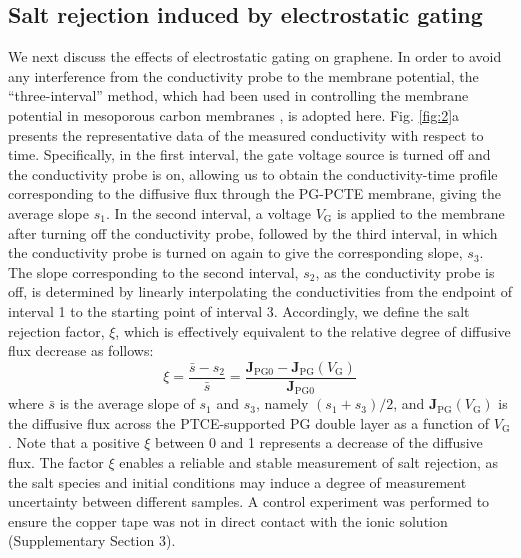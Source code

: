\documentclass[journal=langd5,email=true, hyperref=true, keywords=false]{achemso}
\newcommand{\Fig}{Fig.}
\begin{document}
\subsection{Salt rejection induced by electrostatic gating}
\label{sec:res-2}

We next discuss the effects of electrostatic gating on graphene. In
order to avoid any interference from the conductivity probe to the
membrane potential, the “three-interval” method, which had been used
in controlling the membrane potential in mesoporous carbon membranes
\cite{Surwade_2014}, is adopted here. \Fig{} \ref{fig:2}a presents the
representative data of the measured conductivity with respect to
time. Specifically, in the first interval, the gate voltage source is
turned off and the conductivity probe is on, allowing us to obtain the
conductivity-time profile corresponding to the diffusive flux through
the PG-PCTE membrane, giving the average slope $s_{1}$. In the second
interval, a voltage $V_{\mathrm{G}}$ is applied to the membrane after
turning off the conductivity probe, followed by the third interval, in
which the conductivity probe is turned on again to give the
corresponding slope, $s_{3}$. The slope corresponding to the second
interval, $s_{2}$, as the conductivity probe is off, is determined by
linearly interpolating the conductivities from the endpoint of
interval 1 to the starting point of interval 3. Accordingly, we define
the salt rejection factor, $\xi$, which is effectively equivalent to
the relative degree of diffusive flux decrease as follows:
\begin{equation}
  \label{eq:rejection}
  \xi = \frac{\bar{s} - s_{2}}{\bar{s}} = \frac{\boldsymbol{J}_{\mathrm{PG0}}
    - \boldsymbol{J}_{\mathrm{PG}}(V_{\mathrm{G}})}{\boldsymbol{J}_{\mathrm{PG0}}}
\end{equation}
where $\bar{s}$ is the average slope of $s_{1}$ and $s_{3}$, namely
$(s_{1} + s_{3})/2$, and
$\boldsymbol{J}_{\mathrm{PG}}(V_{\mathrm{G}})$ is the diffusive flux
across the PTCE-supported PG double layer as a function of
$V_{\mathrm{G}}$. Note that a positive $\xi$ between 0 and 1
represents a decrease of the diffusive flux. The factor $\xi$ enables
a reliable and stable measurement of salt rejection, as the salt
species and initial conditions may induce a degree of measurement
uncertainty between different samples. A control experiment was
performed to ensure the copper tape was not in direct contact with the
ionic solution (Supplementary Section 3).
\end{document}

